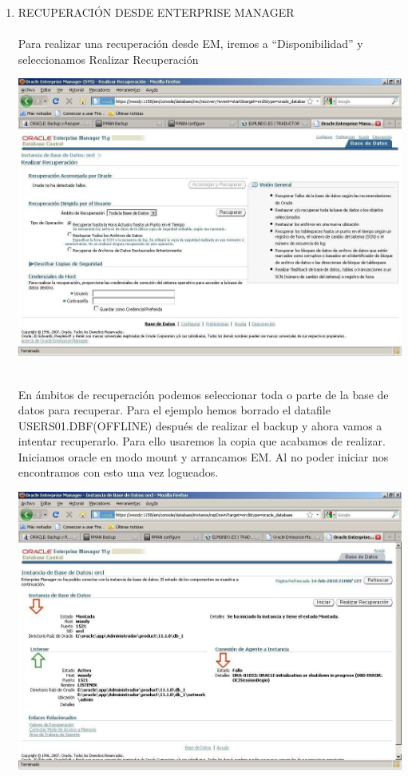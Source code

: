 \begin{enumerate}[1.]
	\item RECUPERACIÓN  DESDE  ENTERPRISE  MANAGER
	\\\\Para realizar una recuperación desde EM, iremos a “Disponibilidad” y seleccionamos Realizar Recuperación
	\begin{center}
	\includegraphics[width=15cm]{./Imagenes/recu_1}  
	\end{center}	
	\\En ámbitos de recuperación podemos seleccionar toda o parte de la base de datos para recuperar.
Para  el  ejemplo  hemos  borrado  el  datafile  USERS01.DBF(OFFLINE)  después  de realizar el backup y ahora vamos a intentar recuperarlo. Para ello usaremos la copia que acabamos de realizar. Iniciamos oracle en modo mount y arrancamos EM. Al no poder iniciar nos encontramos con esto una vez logueados.
	\begin{center}
	\includegraphics[width=15cm]{./Imagenes/recu_2}  

\end{center}
\end{enumerate}
